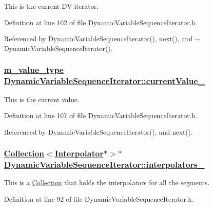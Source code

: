 This is the current DV iterator. 

Definition at line 102 of file Dynamic\-Variable\-Sequence\-Iterator.h.

Referenced by Dynamic\-Variable\-Sequence\-Iterator(), next(), and $\sim$Dynamic\-Variable\-Sequence\-Iterator().\hypertarget{classDynamicVariableSequenceIterator_r3}{
\subsubsection[currentValue\_\-]{\setlength{\rightskip}{0pt plus 5cm}\hyperlink{Types_8h_a3}{m\_\-value\_\-type} \hyperlink{classDynamicVariableSequenceIterator_r3}{Dynamic\-Variable\-Sequence\-Iterator::current\-Value\_\-}}}
\label{classDynamicVariableSequenceIterator_r3}


This is the current value. 

Definition at line 107 of file Dynamic\-Variable\-Sequence\-Iterator.h.

Referenced by Dynamic\-Variable\-Sequence\-Iterator(), and next().\hypertarget{classDynamicVariableSequenceIterator_r0}{
\subsubsection[interpolators\_\-]{\setlength{\rightskip}{0pt plus 5cm}\hyperlink{classCollection}{Collection}$<$\hyperlink{classInterpolator}{Interpolator}$\ast$$>$$\ast$ \hyperlink{classDynamicVariableSequenceIterator_r0}{Dynamic\-Variable\-Sequence\-Iterator::interpolators\_\-}}}
\label{classDynamicVariableSequenceIterator_r0}


This is a \hyperlink{classCollection}{Collection} that holds the interpolators for all the segments. 

Definition at line 92 of file Dynamic\-Variable\-Sequence\-Iterator.h.

